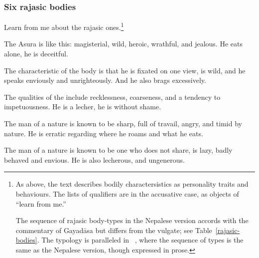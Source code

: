 \begin{translation}
\begin{table}
\begin{tikzpicture}[
    >=Latex,
    lbl/.style={font=\itshape},
    hdr/.style={font=\rmfamily}
    ]
\end{tikzpicture}
\end{table}

\subsubsection{Six rajasic bodies}

\item[88b]
Learn from me about the rajasic ones.\footnote{As above, the text
    describes bodily charactersistics as personality traits and
    behaviours. The lists of qualifiers are in the accusative
    case, as objects of  “learn from me.”  
    
    The sequence of rajasic body-types in the Nepalese version accords
with the commentary of Gayadāsa but differs from the vulgate; see
Table~\ref{rajasic-bodies}. The typology is
paralleled in \CS\ , where the sequence of
types is the same as the Nepalese version, though expressed in
prose.}

\item[88cd--89ab]
%
The Asura   is like this: 
magisterial, wild, heroic, wrathful, and jealous. 
He eats alone, he is deceitful.
%


\item[91cd--92ab]

The characteristic of the  body %
is that he is fixated on one view, is wild, and he speaks enviously
and unrighteously.  And he also brags excessively.

\item[92cd--93ab]

The qualities of the  include recklessness,
coarseness, and a tendency to impetuousness.  He is a lecher, he is
without shame.

\item[89cd--90ab] 

The man of a  nature is known to be sharp, full of
travail, angry, and timid by nature.  He is erratic regarding
where he roams and what he eats.



\item[93cd--94ab]

The man of a  nature is known to be one who does
not share, is lazy, badly behaved and envious.  He is also lecherous,
and ungenerous.  

\item[90cd--91ab]


\end{translation}
